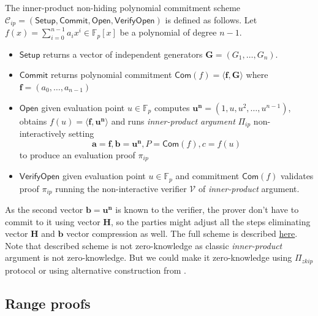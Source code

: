 \documentclass[../lecture-notes-148x210.tex]{subfiles}
\begin{document}
\begin{definition}
    The inner-product non-hiding polynomial commitment scheme $\mathcal{C}_{ip} = (\mathsf{Setup, Commit, Open, VerifyOpen})$ is defined as follows. Let $f(x) = \sum_{i=0}^{n-1} a_i x^i \in \mathbb{F}_p[x]$ be a polynomial of degree $n-1$.
    \begin{itemize}
        \item $\mathsf{Setup}$ returns a vector of independent generators $\mathbf{G} = (G_1, \dots, G_n)$.
        \item $\mathsf{Commit}$ returns polynomial commitment $\mathsf{Com}(f) = \langle \mathbf{f}, \mathbf{G} \rangle$ where $\mathbf{f} = (a_0, \dots, a_{n-1})$
        \item $\mathsf{Open}$ given evaluation point $u \in \mathbb{F}_p$ computes $\mathbf{u^n} = (1, u, u^2, \dots, u^{n-1})$,  obtains $f(u) = \langle \mathbf{f, u^n} \rangle$ and runs \textit{inner-product argument} $\Pi_{ip}$ non-interactively setting 
        $$\mathbf{a} = \mathbf{f}, \mathbf{b} = \mathbf{u^n}, P = \mathsf{Com}(f), c = f(u)$$ 
        to produce an evaluation proof $\pi_{ip}$
        \item $\mathsf{VerifyOpen}$ given evaluation point $u \in \mathbb{F}_p$ and commitment $\mathsf{Com}(f)$ validates proof $\pi_{ip}$ running the non-interactive verifier $\mathcal{V}$ of \textit{inner-product} argument.
    \end{itemize}
\end{definition}

\begin{remark}
    As the second vector $\mathbf{b} = \mathbf{u^n}$ is known to the verifier, the prover don't have to commit to it using vector $\mathbf{H}$, so the parties might adjust all the steps eliminating vector $\mathbf{H}$ and $\mathbf{b}$ vector compression as well. The full scheme is described \href{https://www.zkdocs.com/docs/zkdocs/commitments/ipa-pcs/}{here}. Note that described scheme is not zero-knowledge as classic \textit{inner-product} argument is not zero-knowledge. But we could make it zero-knowledge using $\Pi_{zkip}$ protocol or using alternative construction from .
\end{remark}

\subsection{Range proofs}\label{subsection:bulletproofs-range-proofs}
\end{document}
